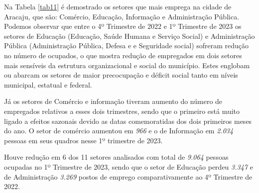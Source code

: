 Na Tabela \ref{tab11} é demostrado os setores que mais emprega na cidade
de Aracaju, que são: Comércio, Educação, Informação e Administração
Pública. Podemos observar que entre o 4º Trimestre de 2022 e 1º
Trimestre de 2023 os setores de Educação (Educação, Saúde Humana e
Serviço Social) e Administração Pública (Administração Pública, Defesa e
e Seguridade social) sofreram redução no número de ocupados, o que
mostra redução de empregados em dois setores mais sensíveis da estrutura
organizacional e social do município. Estes englobam ou abarcam os
setores de maior precocupação e déficit social tanto em níveis
municipal, estatual e federal.

Já os setores de Comércio e informação tiveram aumento do número de
empregados relativos a esses dois trimestres, sendo que o primeiro está
muito ligado a efeitos sazonais devido as datas comemoratidas dos dois
primeiros meses do ano. O setor de comércio aumentou em \emph{966} e o
de Informação em \emph{2.034} pessoas em seus quadros nesse 1º trimestre
de 2023.

Houve redução em 6 dos 11 setores analisados com total de \emph{9.064}
pessoas ocupadas no 1º Trimestre de 2023, sendo que o setor de Educação
perdeu \emph{3.347} e de Administração \emph{3.269} postos de emprego
comparativamente ao 4º Trimestre de 2022.

